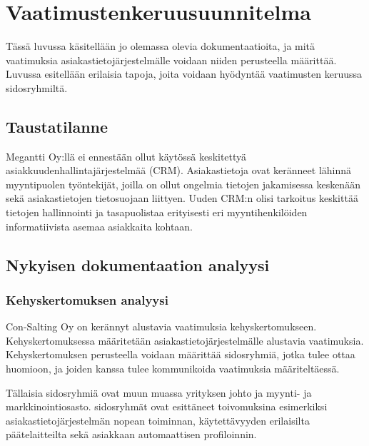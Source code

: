 \chapter{Vaatimustenkeruusuunnitelma} %
\label{keruu} %
\thispagestyle{fancy} %

Tässä luvussa käsitellään jo olemassa olevia dokumentaatioita, ja mitä vaatimuksia asiakastietojärjestelmälle voidaan niiden perusteella määrittää. Luvussa esitellään erilaisia tapoja, joita voidaan hyödyntää vaatimusten keruussa sidosryhmiltä.

\section{Taustatilanne}

Megantti Oy:llä ei ennestään ollut käytössä keskitettyä asiakkuudenhallintajärjestelmää (CRM). %
Asiakastietoja ovat keränneet lähinnä myyntipuolen työntekijät, joilla on ollut ongelmia tietojen jakamisessa keskenään sekä asiakastietojen tietosuojaan liittyen. Uuden CRM:n olisi tarkoitus keskittää tietojen hallinnointi ja tasapuolistaa erityisesti eri myyntihenkilöiden informatiivista asemaa asiakkaita kohtaan.

\section{Nykyisen dokumentaation analyysi}


    \subsection{Kehyskertomuksen analyysi}
    Con-Salting Oy on kerännyt alustavia vaatimuksia kehyskertomukseen. Kehyskertomuksessa määritetään asiakastietojärjestelmälle alustavia vaatimuksia. Kehyskertomuksen perusteella voidaan määrittää sidosryhmiä, jotka tulee ottaa huomioon, ja joiden kanssa tulee kommunikoida vaatimuksia määriteltäessä.

    Tällaisia sidosryhmiä ovat muun muassa yrityksen johto ja myynti- ja markkinointiosasto.
    sidosryhmät ovat esittäneet toivomuksina esimerkiksi asiakastietojärjestelmän nopean toiminnan, käytettävyyden erilaisilta päätelaitteilta sekä asiakkaan 
    automaattisen profiloinnin. 
        
